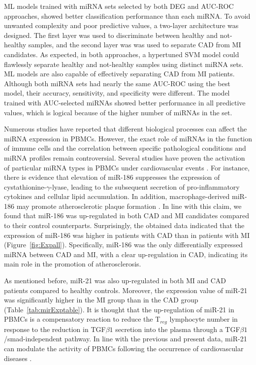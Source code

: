 \documentclass[sn-mathphys,Numbered]{sn-jnl}%
\theoremstyle{thmstyleone}%
\theoremstyle{thmstyletwo}%
\theoremstyle{thmstylethree}%
\begin{document}
ML models trained with miRNA sets selected by both DEG and AUC-ROC
approaches, showed better classification performance than each miRNA. To
avoid unwanted complexity and poor predictive values, a two-layer
architecture was designed. The first layer was used to discriminate
between healthy and not-healthy samples, and the second layer was was
used to separate CAD from MI candidates. As expected, in both
approaches, a hypertuned SVM model could flawlessly separate healthy and
not-healthy samples using distinct miRNA sets. ML models are also
capable of effectively separating CAD from MI patients. Although both
miRNA sets had nearly the same AUC-ROC using the best model, their
accuracy, sensitivity, and specificity were different. The model trained
with AUC-selected miRNAs showed better performance in all predictive
values, which is logical because of the higher number of miRNAs in the
set.

Numerous studies have reported that different biological processes can
affect the miRNA expression in PBMCs. However, the exact role of miRNAs
in the function of immune cells and the correlation between specific
pathological conditions and miRNA profiles remain controversial. Several
studies have proven the activation of particular miRNA types in PBMCs
under cardiovascular events \cite{296}. For instance, there is
evidence that elevation of miR-186 suppresses the expression of
cystathionine-$\gamma$-lyase, leading to the subsequent secretion of
pro-inflammatory cytokines and cellular lipid accumulation. In addition,
macrophage-derived miR-186 may promote atherosclerotic plaque formation
\cite{186}. In line with this claim, we found that miR-186 was
up-regulated in both CAD and MI candidates compared to their control
counterparts. Surprisingly, the obtained data indicated that the
expression of miR-186 was higher in patients with CAD than in patients
with MI (Figure~\ref{fig:Expall}). Specifically, miR-186 was the only
differentially expressed miRNA between CAD and MI, with a clear
up-regulation in CAD, indicating its main role in the promotion of
atherosclerosis.

As mentioned before, miR-21 was also up-regulated in both MI and CAD
patients compared to healthy controls. Moreover, the expression value of
miR-21 was significantly higher in the MI group than in the CAD group
(Table~\ref{tab:mirExptable}). It is thought that the up-regulation of
miR-21 in PBMCs is a compensatory reaction to reduce the T$_{reg}$
lymphocyte number in response to the reduction in TGF$\beta1$
secretion into the plasma through a TGF$\beta1$/smad-independent
pathway. In line with the previous and present data, miR-21 can modulate
the activity of PBMCs following the occurrence of cardiovascular
diseases \cite{21}.
\end{document}
